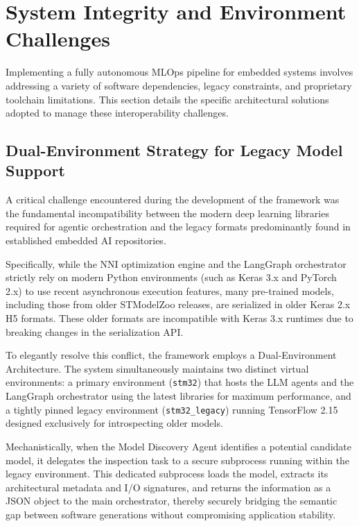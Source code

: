 \section{System Integrity and Environment Challenges}
\label{sec:env_challenges}

Implementing a fully autonomous MLOps pipeline for embedded systems involves addressing a variety of software dependencies, legacy constraints, and proprietary toolchain limitations. This section details the specific architectural solutions adopted to manage these interoperability challenges.

\subsection{Dual-Environment Strategy for Legacy Model Support}
A critical challenge encountered during the development of the framework was the fundamental incompatibility between the modern deep learning libraries required for agentic orchestration and the legacy formats predominantly found in established embedded AI repositories.

Specifically, while the NNI optimization engine and the LangGraph orchestrator strictly rely on modern Python environments (such as Keras 3.x and PyTorch 2.x) to use recent asynchronous execution features, many pre-trained models, including those from older STModelZoo releases, are serialized in older Keras 2.x H5 formats. These older formats are incompatible with Keras 3.x runtimes due to breaking changes in the serialization API.

To elegantly resolve this conflict, the framework employs a Dual-Environment Architecture. The system simultaneously maintains two distinct virtual environments: a primary environment (\texttt{stm32}) that hosts the LLM agents and the LangGraph orchestrator using the latest libraries for maximum performance, and a tightly pinned legacy environment (\texttt{stm32\_legacy}) running TensorFlow 2.15 designed exclusively for introspecting older models.

Mechanistically, when the Model Discovery Agent identifies a potential candidate model, it delegates the inspection task to a secure subprocess running within the legacy environment. This dedicated subprocess loads the model, extracts its architectural metadata and I/O signatures, and returns the information as a JSON object to the main orchestrator, thereby securely bridging the semantic gap between software generations without compromising application stability.

